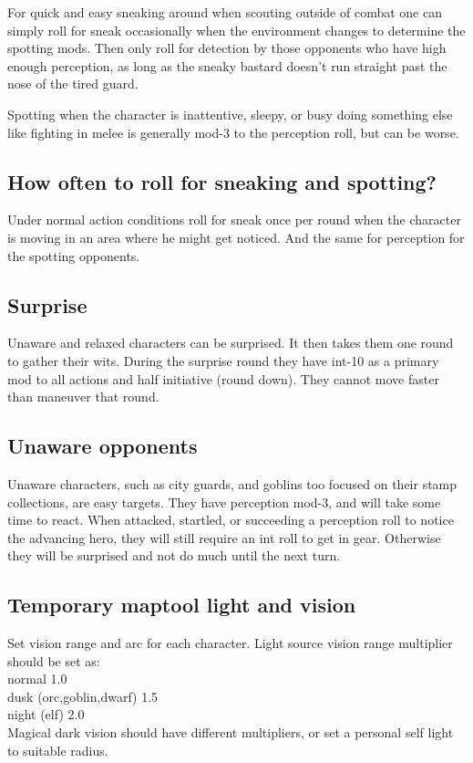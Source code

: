 For quick and easy sneaking around when scouting outside of combat one can simply roll for sneak occasionally when the environment changes to determine the spotting mods. Then only roll for detection by those opponents who have high enough perception, as long as the sneaky bastard doesn't run straight past the nose of the tired guard.

Spotting when the character is inattentive, sleepy, or busy doing something else like fighting in melee is generally mod-3 to the perception roll, but can be worse.


\subsection*{How often to roll for sneaking and spotting?}
Under normal action conditions roll for sneak once per round when the character is moving in an area where he might get noticed. And the same for perception for the spotting opponents.


\subsection*{Surprise}
Unaware and relaxed characters can be surprised. It then takes them one round to gather their wits. During the surprise round they have int-10 as a primary mod to all actions and half initiative (round down). They cannot move faster than maneuver that round.


\subsection*{Unaware opponents}
Unaware characters, such as city guards, and goblins too focused on their stamp collections, are easy targets. They have perception mod-3, and will take some time to react. When attacked, startled, or succeeding a perception roll to notice the advancing hero, they will still require an int roll to get in gear. Otherwise they will be surprised and not do much until the next turn.


\subsection*{Temporary maptool light and vision}
Set vision range and arc for each character.
Light source vision range multiplier should be set as:\\
normal 1.0\\
dusk (orc,goblin,dwarf) 1.5\\
night (elf) 2.0\\
Magical dark vision should have different multipliers, or set a personal self light to suitable radius.



